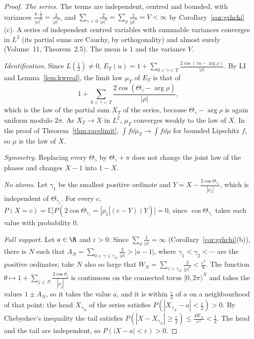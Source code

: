 \begin{proof}
\emph{The series.} The terms are independent, centred and bounded, with variances $\frac{4\cdot\frac12}{|\rho|^2}=\frac2{|\rho|^2}$, and $\sum_{\gamma>0}\frac2{|\rho|^2}=\sum_\rho\frac1{|\rho|^2}=V<\infty$ by Corollary~\ref{cor:grhchi}(c). A series of independent centred variables with summable variances converges in $L^2$ (its partial sums are Cauchy, by orthogonality) and almost surely (Volume~11, Theorem~2.5). The mean is $1$ and the variance $V$.

\emph{Identification.} Since $L(\frac12)\ne0$, $E_T(u)=1+\sum_{0<\gamma<T}\frac{2\cos(\gamma u-\arg\rho)}{|\rho|}$. By LI and Lemma~\ref{lem:kwreal}, the limit law $\mu_T$ of $E_T$ is that of
\[
1+\sum_{0<\gamma<T}\frac{2\cos(\Theta_\gamma-\arg\rho)}{|\rho|},
\]
which is the law of the partial sum $X_T$ of the series, because $\Theta_\gamma-\arg\rho$ is again uniform modulo $2\pi$. As $X_T\to X$ in $L^2$, $\mu_T$ converges weakly to the law of $X$. In the proof of Theorem~\ref{thm:racelimit}, $\int f\dd\mu_T\to\int f\dd\mu$ for bounded Lipschitz $f$, so $\mu$ is the law of $X$.

\emph{Symmetry.} Replacing every $\Theta_\gamma$ by $\Theta_\gamma+\pi$ does not change the joint law of the phases and changes $X-1$ into $1-X$.

\emph{No atoms.} Let $\gamma_1$ be the smallest positive ordinate and $Y=X-\frac{2\cos\Theta_{\gamma_1}}{|\rho_1|}$, which is independent of $\Theta_{\gamma_1}$. For every $c$, $P(X=c)=\mathbb E\bigl[P(2\cos\Theta_{\gamma_1}=|\rho_1|(c-Y)\mid Y)\bigr]=0$, since $\cos\Theta_{\gamma_1}$ takes each value with probability $0$.

\emph{Full support.} Let $a\in\R$ and $\varepsilon>0$. Since $\sum_\rho\frac1{|\rho|}=\infty$ (Corollary~\ref{cor:grhchi}(b)), there is $N$ such that $A_N=\sum_{0<\gamma\le\gamma_N}\frac2{|\rho|}>|a-1|$, where $\gamma_1<\gamma_2<\cdots$ are the positive ordinates; take $N$ also so large that $W_N=\sum_{\gamma>\gamma_N}\frac2{|\rho|^2}<\frac{\varepsilon^2}8$. The function $\theta\mapsto1+\sum_{j\le N}\frac{2\cos\theta_j}{|\rho_j|}$ is continuous on the connected torus $[0,2\pi)^N$ and takes the values $1\pm A_N$, so it takes the value $a$, and it is within $\frac\varepsilon2$ of $a$ on a neighbourhood of that point: the head $X_{\gamma_N}$ of the series satisfies $P(|X_{\gamma_N}-a|<\frac\varepsilon2)>0$. By Chebyshev's inequality the tail satisfies $P(|X-X_{\gamma_N}|\ge\frac\varepsilon2)\le\frac{4W_N}{\varepsilon^2}<\frac12$. The head and the tail are independent, so $P(|X-a|<\varepsilon)>0$.
\end{proof}

